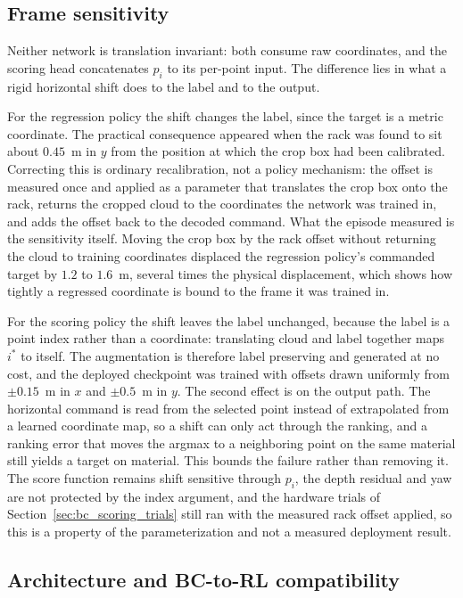 \subsection{Frame sensitivity}

Neither network is translation invariant: both consume raw coordinates, and
the scoring head concatenates $p_i$ to its per-point input. The difference
lies in what a rigid horizontal shift does to the label and to the output.

For the regression policy the shift changes the label, since the target is a
metric coordinate. The practical consequence appeared when the rack was found
to sit about $0.45$~m in $y$ from the position at which the crop box had been
calibrated. Correcting this is ordinary recalibration, not a policy
mechanism: the offset is measured once and applied as a parameter that
translates the crop box onto the rack, returns the cropped cloud to the
coordinates the network was trained in, and adds the offset back to the
decoded command. What the episode measured is the sensitivity itself. Moving
the crop box by the rack offset without returning the cloud to training
coordinates displaced the regression policy's commanded target by $1.2$ to
$1.6$~m, several times the physical displacement, which shows how tightly a
regressed coordinate is bound to the frame it was trained in.

For the scoring policy the shift leaves the label unchanged, because the
label is a point index rather than a coordinate: translating cloud and label
together maps $i^*$ to itself. The augmentation is therefore label preserving
and generated at no cost, and the deployed checkpoint was trained with
offsets drawn uniformly from $\pm 0.15$~m in $x$ and $\pm 0.5$~m in $y$. The
second effect is on the output path. The horizontal command is read from the
selected point instead of extrapolated from a learned coordinate map, so a
shift can only act through the ranking, and a ranking error that moves the
argmax to a neighboring point on the same material still yields a target on
material. This bounds the failure rather than removing it. The score function
remains shift sensitive through $p_i$, the depth residual and yaw are not
protected by the index argument, and the hardware trials of
Section~\ref{sec:bc_scoring_trials} still ran with the measured rack offset
applied, so
this is a property of the parameterization and not a measured deployment
result.

\subsection{Architecture and BC-to-RL compatibility}

